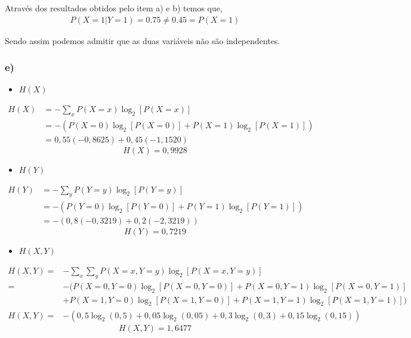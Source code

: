 \documentclass[12pt]{article}
\begin{document}
Através dos resultados obtidos pelo item a) e b) temos que,
\begin{align*}
	P(X=1|Y=1) = 0.75 \neq 0.45 = P(X=1)
\end{align*}


Sendo assim podemos admitir que as duas variáveis não são independentes.


\subsubsection*{e)}
\begin{itemize}
	\item{\large $H(X)$}
\end{itemize}


\begin{align*}
	H(X) &= - \sum_{x}P(X=x)\log_2[P(X=x)]\\
		& = -(P(X=0)\log_2[P(X=0)] + P(X=1)\log_2[P(X=1)])\\
		& = 0,55(-0,8625) + 0,45(-1,1520)
\end{align*}
\begin{equation*}
\boxed{H(X) = 0,9928}
\end{equation*}
\vspace{2cm}
\begin{itemize}
	\item{\large $H(Y)$}
\end{itemize}


\begin{align*}
	H(Y) &= - \sum_{y}P(Y=y)\log_2[P(Y=y)]\\
		& = -(P(Y=0)\log_2[P(Y=0)] + P(Y=1)\log_2[P(Y=1)])\\
		& = -(0,8(-0,3219) + 0,2(-2,3219))
\end{align*}
\begin{equation*}
\boxed{H(Y) = 0,7219}
\end{equation*}
\vspace{2cm}
\begin{itemize}
	\item{\large $H(X,Y)$}
\end{itemize}


\begin{align*}
H(X,Y) = &- \sum_{x}\sum_{y}P(X=x,Y=y)\log_2[P(X=x,Y=y)]\\
	   = &- ( P(X=0,Y=0)\log_2[P(X=0,Y=0)] + P(X=0,Y=1)\log_2[P(X=0,Y=1)]  \\
	     &+   P(X=1,Y=0)\log_2[P(X=1,Y=0)] + P(X=1,Y=1)\log_2[P(X=1,Y=1)])\\
H(X,Y) = &-(0,5\log_2(0,5) + 0,05\log_2(0,05) + 0,3\log_2(0,3) + 0,15\log_2(0,15))
\end{align*}
\begin{equation*}
\boxed{H(X,Y) = 1,6477}
\end{equation*}
\vspace{2cm}
\end{document}
